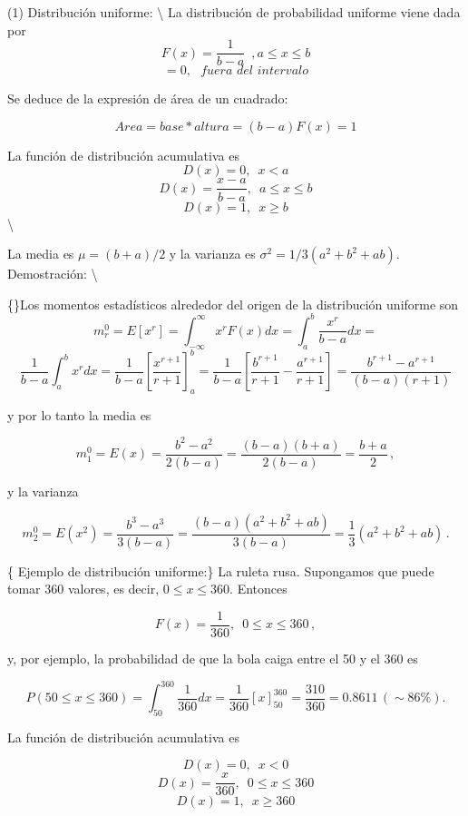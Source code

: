 \documentclass[
]{agujournal2019}
\begin{document}
\vspace{0.5cm}

\noindent (1) Distribución uniforme: \textbackslash{} La distribución de
probabilidad uniforme viene dada por
\[F(x)=\frac{1}{b-a}\,\,\,, a \le x \le b\]
\[=0,\,\,\,\,fuera\,\,del\,\,intervalo\]

Se deduce de la expresión de área de un cuadrado:

\[Area=base*altura=(b-a)F(x)=1\]

La función de distribución acumulativa es \[D(x)=0,\,\,\,x<a\]
\[D(x)=\frac{x-a}{b-a},\,\,\,a \le x \le b\] \[D(x)=1,\,\,\,x \ge b\]
\textbackslash{}

\begin{center}
\end{center}

La media es \(\mu=(b+a)/2\) y la varianza es
\(\sigma^2=1/3(a^2 + b^2 +ab)\). Demostración: \textbackslash{}

\{\noindent\}Los momentos estadísticos alrededor del origen de la
distribución uniforme son
\[m^0_r=E[x^r]=\int^{\infty}_{-\infty} x^rF(x)dx=\int^{b}_{a} \frac{x^r}{b-a}dx=\]
\[\frac{1}{b-a}\int^{b}_{a}x^r dx=\frac{1}{b-a}\left[\frac{x^{r+1}}{r+1}\right]^b_a=
      \frac{1}{b-a}\left[\frac{b^{r+1}}{r+1}-\frac{a^{r+1}}{r+1}\right]=\frac{b^{r+1}-a^{r+1}}{(b-a)(r+1)}\]

y por lo tanto la media es

\[m^0_1=E(x)=\frac{b^2-a^2}{2(b-a)}=\frac{(b-a)(b+a)}{2(b-a)}=\frac{b+a}{2}\,,\]

y la varianza

\[m^0_2=E(x^2)=\frac{b^3-a^3}{3(b-a)}=\frac{(b-a)(a^2+b^2+ab)}{3(b-a)}=\frac{1}{3}(a^2 + b^2 +ab)\,.\]

\{ Ejemplo de distribución uniforme:\} La ruleta rusa. Supongamos que
puede tomar 360 valores, es decir, \(0 \le x \le 360\). Entonces

\[F(x)=\frac{1}{360},\,\,\,0 \le x \le 360\,,\]

y, por ejemplo, la probabilidad de que la bola caiga entre el 50 y el
360 es

\[P(50\le x \le 360)=\int^{360}_{50}\frac{1}{360}dx=\frac{1}{360}\left[x\right]^{360}_{50}=\frac{310}{360}=0.8611\,(\sim86\%).\]

La función de distribución acumulativa es

\[D(x)=0,\,\,\,x<0\] \[D(x)=\frac{x}{360},\,\,\,0 \le x \le 360\]
\[D(x)=1,\,\,\,x \ge 360\]
\end{document}
